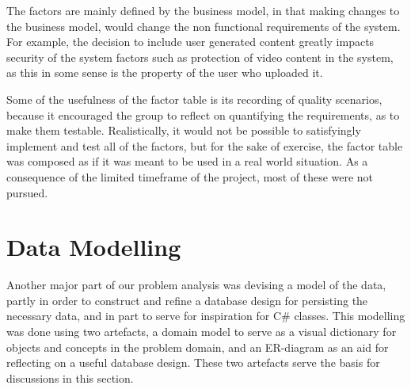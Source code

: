 The factors are mainly defined by the business model, in that making changes to the business model, would change the non functional requirements of the system.  For example, the decision to include user generated content greatly impacts security of the system factors such as protection of video content in the system, as this in some sense is the property of the user who uploaded it.

Some of the usefulness of the factor table is its recording of quality scenarios, because it encouraged the group to reflect on quantifying the requirements, as to make them testable. Realistically, it would not be possible to satisfyingly implement and test all of the factors, but for the sake of exercise, the factor table was composed as if it was meant to be used in a real world situation. As a consequence of the limited timeframe of the project, most of these were not pursued.

\section{Data Modelling}
Another major part of our problem analysis was devising a model of the data, partly in order to construct and refine a database design for persisting the necessary data, and in part to serve for inspiration for C\# classes.
This modelling was done using two artefacts, a domain model to serve as a visual dictionary for objects and concepts in the problem domain, and an ER-diagram as an aid for reflecting on a useful database design. These two artefacts serve the basis for discussions in this section.


